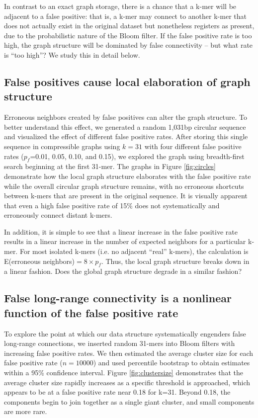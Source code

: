 \documentclass{pnastwo}
\begin{document}
\begin{article}
In contrast to an exact graph storage, there is a chance that a k-mer will
be adjacent to a false positive: that is, a k-mer may connect to another k-mer that does not
actually exist in the original dataset but nonetheless registers as present,
due to the probabilistic nature of the Bloom filter.  If the false positive rate is too high, the graph structure will
be dominated by false connectivity -- but what rate is ``too high''?  We study this in detail below.

\subsection{False positives cause local elaboration of graph structure}

Erroneous neighbors created by false positives can alter the graph
structure.  To better understand this effect, we generated a random
1,031bp circular sequence and visualized the effect of different false
positive rates.  After storing this single sequence in compressible
graphs using $k=31$ with four different false positive rates
($p_f$=0.01, 0.05, 0.10, and 0.15), we explored the graph using
breadth-first search beginning at the first 31-mer.  The graphs in
Figure \ref{fig:circles} demonstrate how the local graph structure elaborates with the
false positive rate while the overall circular graph structure
remains, with no erroneous shortcuts between k-mers that are present
in the original sequence.  It is visually apparent that even a high false positive rate of 15\% does not systematically and erroneously connect distant k-mers.

In addition, it is simple to see that a linear increase in the false 
positive rate results in a linear increase in the number of expected 
neighbors for a particular k-mer. For most isolated k-mers (i.e. no adjacent 
``real'' k-mers), the calculation is 
E(erroneous neighbors)$ = 8 \times p_f$. Thus, the local graph 
structure breaks down in a linear fashion.  Does the global graph structure
degrade in a similar fashion?

\subsection{False long-range connectivity is a nonlinear function of the false positive rate}

To explore the point at which our data structure systematically
engenders false long-range connections, we inserted random 31-mers
into Bloom filters with increasing false positive rates.  We then
estimated the average cluster size for each false positive rate
($n=10000$) and used percentile bootstrap to obtain estimates within a
95\% confidence interval. Figure \ref{fig:clustersize} demonstrates that the average cluster size
rapidly increases as a specific threshold is approached, which appears
to be at a false positive rate near 0.18 for k=31. Beyond 0.18, the components
begin to join together as a single giant cluster, and small components
are more rare.


\end{article}
\end{document}
